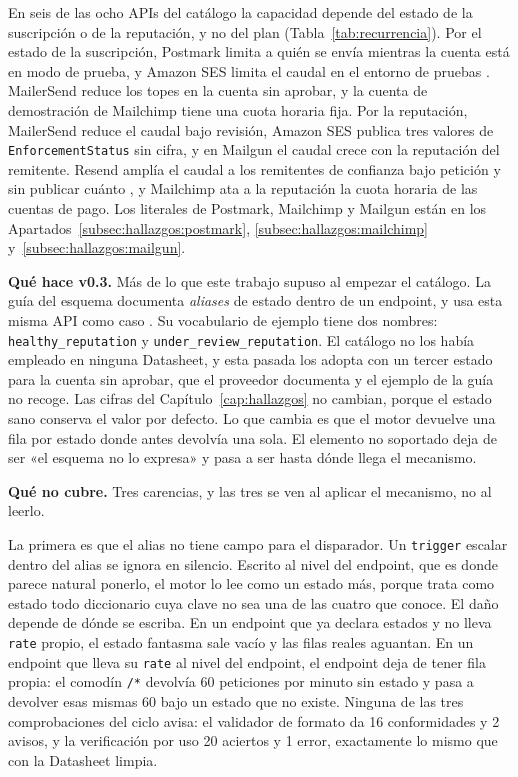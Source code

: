 En seis de las ocho APIs del catálogo la capacidad depende del estado de la suscripción o de la reputación, y no del plan (Tabla~\ref{tab:recurrencia}).
Por el estado de la suscripción, Postmark limita a quién se envía mientras la cuenta está en modo de prueba, y Amazon SES limita el caudal en el entorno de pruebas \citep{sesdocs}.
MailerSend reduce los topes en la cuenta sin aprobar, y la cuenta de demostración de Mailchimp tiene una cuota horaria fija.
Por la reputación, MailerSend reduce el caudal bajo revisión, Amazon SES publica tres valores de \texttt{EnforcementStatus} sin cifra, y en Mailgun el caudal crece con la reputación del remitente.
Resend amplía el caudal a los remitentes de confianza bajo petición y sin publicar cuánto \citep{resenddocs}, y Mailchimp ata a la reputación la cuota horaria de las cuentas de pago.
Los literales de Postmark, Mailchimp y Mailgun están en los Apartados~\ref{subsec:hallazgos:postmark}, \ref{subsec:hallazgos:mailchimp} y~\ref{subsec:hallazgos:mailgun}.

\textbf{Qué hace v0.3.} Más de lo que este trabajo supuso al empezar el catálogo.
La guía del esquema documenta \textit{aliases} de estado dentro de un endpoint, y
usa esta misma API como caso \citep{apisconsumptionmodel}. Su vocabulario de
ejemplo tiene dos nombres: \texttt{healthy\_reputation} y
\texttt{under\_review\_reputation}. El catálogo no los había empleado en ninguna
Datasheet, y esta pasada los adopta con un tercer estado para la cuenta sin
aprobar, que el proveedor documenta y el ejemplo de la guía no recoge. Las cifras
del Capítulo~\ref{cap:hallazgos} no cambian, porque el estado sano conserva el
valor por defecto. Lo que cambia es que el motor devuelve una fila por estado
donde antes devolvía una sola. El elemento no soportado deja de ser «el esquema no lo expresa»
y pasa a ser hasta dónde llega el mecanismo.

\textbf{Qué no cubre.} Tres carencias, y las tres se ven al aplicar el mecanismo,
no al leerlo.

La primera es que el alias no tiene campo para el disparador. Un \texttt{trigger}
escalar dentro del alias se ignora en silencio. Escrito al nivel del endpoint, que
es donde parece natural ponerlo, el motor lo lee como un estado más, porque trata
como estado todo diccionario cuya clave no sea una de las cuatro que conoce. El
daño depende de dónde se escriba. En un
endpoint que ya declara estados y no lleva \texttt{rate} propio, el estado
fantasma sale vacío y las filas reales aguantan. En un endpoint que lleva su
\texttt{rate} al nivel del endpoint, el endpoint deja de tener fila propia: el
comodín \texttt{/*} devolvía 60 peticiones por minuto sin estado y pasa a devolver
esas mismas 60 bajo un estado que no existe. Ninguna de las tres comprobaciones del
ciclo avisa: el validador de formato da 16 conformidades y 2 avisos, y la
verificación por uso 20 aciertos y 1 error, exactamente lo mismo que con la
Datasheet limpia.

